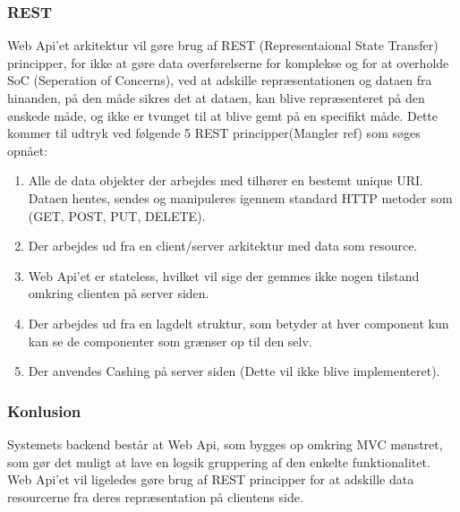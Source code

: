 \subsubsection{REST}
Web Api’et arkitektur vil gøre brug af REST (Representaional State Transfer) principper, for ikke at gøre data overførelserne for komplekse og for at overholde SoC (Seperation of Concerns), ved at adskille repræsentationen og dataen fra hinanden, på den måde sikres det at dataen, kan blive repræsenteret på den ønskede måde, og ikke er tvunget til at blive gemt på en specifikt måde.
Dette kommer til udtryk ved følgende 5 REST principper(Mangler ref)  som søges opnået:
\begin{enumerate}
 \item Alle de data objekter der arbejdes med tilhører en bestemt unique URI. Dataen hentes, sendes og manipuleres igennem standard HTTP metoder som (GET, POST, PUT, DELETE).
 \item Der arbejdes ud fra en client/server arkitektur med data som resource. 
 \item Web Api’et er stateless, hvilket vil sige der gemmes ikke nogen tilstand omkring clienten på server siden.
 \item Der arbejdes ud fra en lagdelt struktur, som betyder at hver component kun kan se de componenter som grænser op til den selv.
 \item Der anvendes Cashing på server siden (Dette vil ikke blive implementeret).
\end{enumerate}

\subsubsection{Konlusion}

Systemets backend består at Web Api, som bygges op omkring MVC mønstret, som gør det muligt at lave en logsik gruppering af den enkelte funktionalitet. Web Api’et vil ligeledes gøre brug af REST principper for at adskille data resourcerne fra deres repræsentation på clientens side.

\newpage
